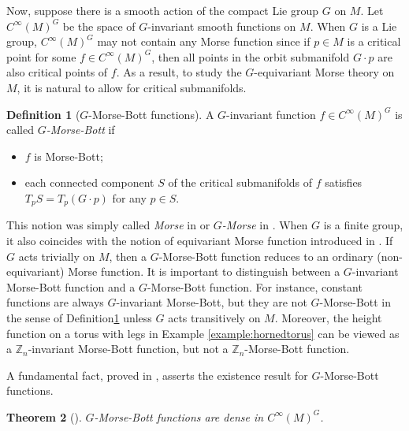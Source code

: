\documentclass[11pt]{amsart}
\newtheorem{theorem}{Theorem}[section]
\theoremstyle{definition}
\newtheorem{definition}[theorem]{Definition}
\numberwithin{equation}{subsection}
\begin{document}
Now, suppose there is a smooth action of the compact Lie group \(G\) on \(M\). Let $C^{\infty}(M)^G$ be the space of $G$-invariant smooth functions on $M$. When $G$ is a Lie group, $C^{\infty}(M)^G$ may not contain any Morse function since if $p\in M$ is a critical point for some $f\in C^{\infty}(M)^G$, then all points in the orbit submanifold $G\cdot p$ are also critical points of $f$.  As a result, to study the $G$-equivariant Morse theory on $M$, it is natural to allow for critical submanifolds.

\begin{definition}[$G$-Morse-Bott functions]\label{definition:G-Morse-Bott}
A $G$-invariant function $f\in C^{\infty}(M)^G$ is called \emph{$G$-Morse-Bott} if 
\begin{itemize}
    \item $f$ is Morse-Bott;
    \item each connected component $S$ of the critical submanifolds of $f$ satisfies $T_pS=T_p(G\cdot p)$ for any $p\in S$.
\end{itemize}
\end{definition}

This notion was simply called \emph{Morse} in \cite{wasserman1969equivariant} or \emph{$G$-Morse} in \cite{baizhang20}. When $G$ is a finite group, it also coincides with the notion of equivariant Morse function introduced in \cite[Definition 1.1]{bao2024morse}. If $G$ acts trivially on $M$, then a $G$-Morse-Bott function reduces to an ordinary (non-equivariant) 
Morse function. It is important to distinguish between a $G$-invariant Morse-Bott function and a 
$G$-Morse-Bott function. For instance, constant functions are always 
$G$-invariant Morse-Bott, but they are not $G$-Morse-Bott in the sense of 
Definition\ref{definition:G-Morse-Bott} unless $G$ acts transitively on $M$. Moreover, the height function on a torus with legs in Example \ref{example:hornedtorus} can be viewed as a $\mathbb{Z}_n$-invariant Morse-Bott function, but not a $\mathbb{Z}_n$-Morse-Bott function. 

A fundamental fact, proved in \cite[Lemma 4.8]{wasserman1969equivariant}, asserts the existence result for $G$-Morse-Bott functions.

\begin{theorem}[\cite{wasserman1969equivariant}]\label{thm:wasserman}
 $G$-Morse-Bott functions are dense in $C^{\infty}(M)^G$.
\end{theorem}
\end{document}
